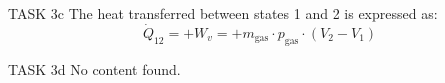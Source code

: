 TASK 3c  
The heat transferred between states 1 and 2 is expressed as:  
\[
\dot{Q}_{12} = +W_v = +m_{\text{gas}} \cdot p_{\text{gas}} \cdot (V_2 - V_1)
\]  

TASK 3d  
No content found.